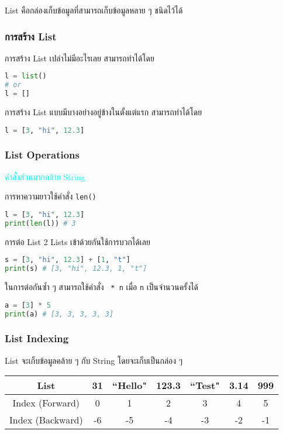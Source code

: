 List คือกล่องเก็บข้อมูลที่สามารถเก็บข้อมูลหลาย ๆ ชนิดไว้ได้

\subsubsection{การสร้าง List}

การสร้าง List เปล่าไม่มีอะไรเลย สามารถทำได้โดย

\begin{lstlisting}[language=Python]
l = list()
# or
l = []
\end{lstlisting}

การสร้าง List แบบมีบางอย่างอยู่ข้างในตั้งแต่แรก สามารถทำได้โดย

\begin{lstlisting}[language=Python]
l = [3, "hi", 12.3]
\end{lstlisting}

\subsubsection{List Operations}

\textcolor{cyan}{คำสั่งส่วนมากคล้าย String}

การหาความยาวใช้คำสั่ง \verb|len()|

\begin{lstlisting}[language=Python]
l = [3, "hi", 12.3]
print(len(l)) # 3
\end{lstlisting}

การต่อ List 2 Lists เข้าด้วยกันใช้การบวกได้เลย

\begin{lstlisting}[language=Python]
s = [3, "hi", 12.3] + [1, "t"]
print(s) # [3, "hi", 12.3, 1, "t"]
\end{lstlisting}

ในการต่อกันซ้ำ ๆ สามารถใช้คำสั่ง \verb | * n| เมื่อ \verb|n| เป็นจำนวนครั้งได้

\begin{lstlisting}[language=Python]
a = [3] * 5
print(a) # [3, 3, 3, 3, 3]
\end{lstlisting}

\subsubsection{List Indexing}

List จะเก็บข้อมูลคล้าย ๆ กับ String โดยจะเก็บเป็นกล่อง ๆ 

\begin{center}
    \begin{tabular}{|c|c|c|c|c|c|c|}
         \hline
         List & 31 & ``Hello" & 123.3 & ``Test" & 3.14 & 999\\
         \hline
         Index (Forward) & 0 & 1 & 2 & 3 & 4 & 5\\
         \hline
         Index (Backward) & -6 & -5 & -4 & -3 & -2 & -1\\
         \hline
    \end{tabular}
\end{center}

